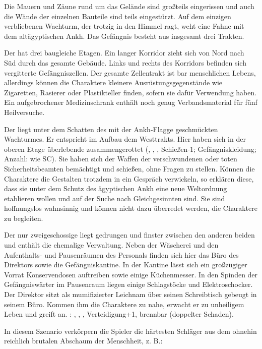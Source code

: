 {		Die Mauern und Zäune rund um das Gelände sind großteils eingerissen und auch die Wände der einzelnen Bauteile sind teils eingestürzt. Auf dem einzigen verbliebenen Wachturm, der trotzig in den Himmel ragt, weht eine Fahne mit dem altägyptischen Ankh. Das Gefängnis besteht aus insgesamt drei Trakten.

		Der  hat drei baugleiche Etagen. Ein langer Korridor zieht sich von Nord nach Süd durch das gesamte Gebäude. Links und rechts des Korridors befinden sich vergitterte Gefängniszellen. Der gesamte Zellentrakt ist bar menschlichen Lebens, allerdings können die Charaktere kleinere Ausrüstungsgegenstände wie Zigaretten, Rasierer oder Plastikteller finden, sofern sie dafür Verwendung haben. Ein aufgebrochener Medizinschrank enthält noch genug Verbandsmaterial für fünf Heilversuche.

		Der  liegt unter dem Schatten des mit der Ankh-Flagge geschmückten Wachturmes. Er entspricht im Aufbau dem Westtrakts. Hier haben sich in der oberen Etage überlebende  zusammengerottet (, , , Schießen-1; Gefängniskleidung; Anzahl: wie SC). Sie haben sich der Waffen der verschwundenen oder toten Sicherheitsbeamten bemächtigt und schießen, ohne Fragen zu stellen. Können die Charaktere die Gestalten trotzdem in ein Gespräch verwickeln, so erklären diese, dass sie unter dem Schutz des ägyptischen Ankh eine neue Weltordnung etablieren wollen und auf der Suche nach Gleichgesinnten sind. Sie sind hoffnungslos wahnsinnig und können nicht dazu überredet werden, die Charaktere zu begleiten.

		Der nur zweigeschossige  liegt gedrungen und finster zwischen den anderen beiden und enthält die ehemalige Verwaltung. Neben der Wäscherei und den Aufenthalts- und Pausenräumen des Personals finden sich hier das Büro des Direktors sowie die Gefängniskantine. In der Kantine lässt sich ein großzügiger Vorrat Konservendosen auftreiben sowie einige Küchenmesser. In den Spinden der Gefängniswärter im Pausenraum liegen einige Schlagstöcke und Elektroschocker. Der Direktor sitzt als mumifizierter Leichnam über seinen Schreibtisch gebeugt in seinem Büro. Kommen ihm die Charaktere zu nahe, erwacht er zu unheiligem Leben und greift an. : , , , Verteidigung+1, brennbar (doppelter Schaden).


		\noindent
		In diesem Szenario verkörpern die Spieler die härtesten Schläger aus dem ohnehin reichlich brutalen Abschaum der Menschheit, z. B.:

}

